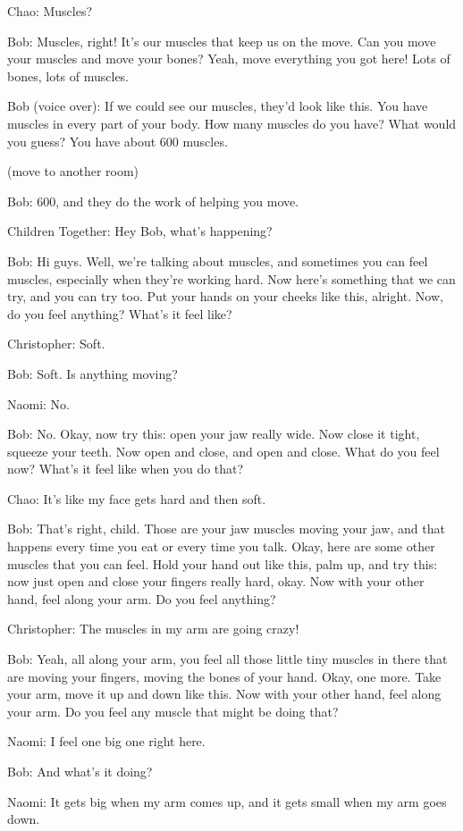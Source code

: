Chao: Muscles?

Bob: Muscles, right! It's our muscles that keep us on the move. Can you move your muscles and move your bones? Yeah, move everything you got here! Lots of bones, lots of muscles.

Bob (voice over): If we could see our muscles, they'd look like this. You have muscles in every part of your body. How many muscles do you have? What would you guess? You have about 600 muscles.

(move to another room)

Bob: 600, and they do the work of helping you move.

Children Together: Hey Bob, what's happening?

Bob: Hi guys. Well, we're talking about muscles, and sometimes you can feel muscles, especially when they're working hard. Now here's something that we can try, and you can try too. Put your hands on your cheeks like this, alright. Now, do you feel anything? What's it feel like?

Christopher: Soft.

Bob: Soft. Is anything moving?

Naomi: No.

Bob: No. Okay, now try this: open your jaw really wide. Now close it tight, squeeze your teeth. Now open and close, and open and close. What do you feel now? What's it feel like when you do that?

Chao: It's like my face gets hard and then soft.

Bob: That's right, child. Those are your jaw muscles moving your jaw, and that happens every time you eat or every time you talk. Okay, here are some other muscles that you can feel. Hold your hand out like this, palm up, and try this: now just open and close your fingers really hard, okay. Now with your other hand, feel along your arm. Do you feel anything?

Christopher: The muscles in my arm are going crazy!

Bob: Yeah, all along your arm, you feel all those little tiny muscles in there that are moving your fingers, moving the bones of your hand. Okay, one more. Take your arm, move it up and down like this. Now with your other hand, feel along your arm. Do you feel any muscle that might be doing that?

Naomi: I feel one big one right here.

Bob: And what's it doing?

Naomi: It gets big when my arm comes up, and it gets small when my arm goes down.

